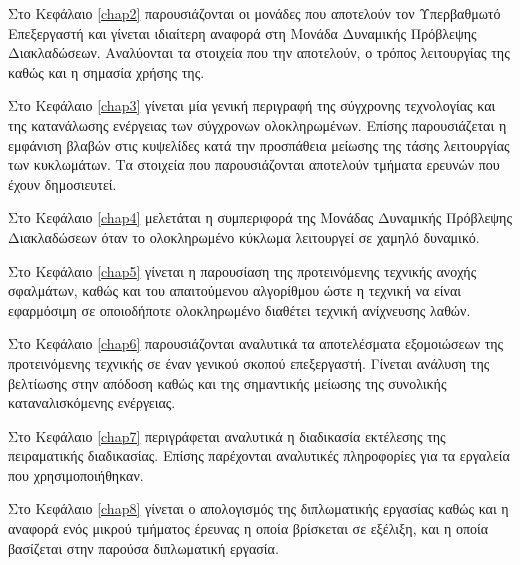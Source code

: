 Στο Κεφάλαιο \ref{chap2} παρουσιάζονται οι μονάδες που αποτελούν τον Υπερβαθμωτό Επεξεργαστή και γίνεται ιδιαίτερη αναφορά στη Μονάδα Δυναμικής Πρόβλεψης Διακλαδώσεων. Αναλύονται τα στοιχεία που την αποτελούν, ο τρόπος λειτουργίας της καθώς και η σημασία χρήσης της.
\par
Στο Κεφάλαιο \ref{chap3} γίνεται μία γενική περιγραφή της σύγχρονης τεχνολογίας και της κατανάλωσης ενέργειας των σύγχρονων ολοκληρωμένων. Επίσης παρουσιάζεται η εμφάνιση βλαβών στις κυψελίδες  κατά την προσπάθεια μείωσης της τάσης λειτουργίας των κυκλωμάτων. Τα στοιχεία που παρουσιάζονται αποτελούν τμήματα ερευνών που έχουν δημοσιευτεί.
\par
Στο Κεφάλαιο \ref{chap4} μελετάται η συμπεριφορά της Μονάδας Δυναμικής Πρόβλεψης Διακλαδώσεων όταν το ολοκληρωμένο κύκλωμα λειτουργεί σε χαμηλό δυναμικό.
\par
Στο Κεφάλαιο \ref{chap5} γίνεται η παρουσίαση της προτεινόμενης τεχνικής ανοχής σφαλμάτων, καθώς και του απαιτούμενου αλγορίθμου ώστε η τεχνική να είναι εφαρμόσιμη σε οποιοδήποτε ολοκληρωμένο διαθέτει τεχνική ανίχνευσης λαθών.
\par
Στο Κεφάλαιο \ref{chap6} παρουσιάζονται αναλυτικά τα αποτελέσματα εξομοιώσεων της προτεινόμενης τεχνικής σε έναν γενικού σκοπού επεξεργαστή. Γίνεται ανάλυση της βελτίωσης στην απόδοση καθώς και της σημαντικής μείωσης της συνολικής καταναλισκόμενης ενέργειας.
\par
Στο Κεφάλαιο \ref{chap7} περιγράφεται αναλυτικά η διαδικασία εκτέλεσης της πειραματικής διαδικασίας. Επίσης παρέχονται αναλυτικές πληροφορίες για τα εργαλεία που χρησιμοποιήθηκαν.
\par
Στο Κεφάλαιο \ref{chap8} γίνεται ο απολογισμός της διπλωματικής εργασίας καθώς και η αναφορά ενός μικρού τμήματος έρευνας η οποία βρίσκεται σε εξέλιξη, και η οποία βασίζεται στην παρούσα διπλωματική εργασία.

